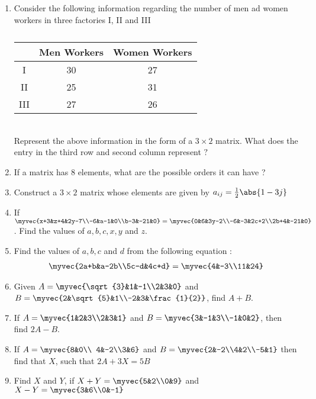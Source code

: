 \begin{enumerate}
\item Consider the following information regarding the number of men ad women workers in three factories I, II and III 
\begin{table}[ht!]
\centering
\begin{tabular}{|c|c|c|}
\hline
 & Men Workers & Women Workers\\
\hline
I &30&27\\
\hline
II  &25&31\\
\hline
III &27&26\\
\hline
\end{tabular}
\caption{}
\end{table}\\
Represent the above information in the form of a $3\times 2$ matrix. What does the entry in the third row and second column represent $?$
\item If a matrix has $8$ elements, what are the possible orders it can have ?
\item Construct a $3\times 2$ matrix whose elements are given by $a_{ij}= \frac{1}{2}\abs{1-3j}$
\item If $\myvec{x+3&z+4&2y-7\\-6&a-1&0\\b-3&-21&0}=\myvec{0&6&3y-2\\-6&-3&2c+2\\2b+4&-21&0}$. Find the values of $a,b,c,x,y$ and $z$. 
\item Find the values of $a, b, c$ and $d$ from the following equation :
\begin{align} 
\myvec{2a+b&a-2b\\5c-d&4c+d} = \myvec{4&-3\\11&24} 
\end{align}
\item Given $A=\myvec{\sqrt{3}&1&-1\\2&3&0}$ and $B=\myvec{2&\sqrt{5}&1\\-2&3&\frac{1}{2}}$, find $A+B$.
\item If $A=\myvec{1&2&3\\2&3&1}$ and $B=\myvec{3&-1&3\\-1&0&2}$, then find $2A-B$.
\item If $A=\myvec{8&0\\ 4&-2\\3&6}$ and $B=\myvec{2&-2\\4&2\\-5&1}$ then find that $X$, such that $2A+3X=5B$
\item Find $X$ and $Y$, if $X+Y=\myvec{5&2\\0&9}$ and $X-Y=\myvec{3&6\\0&-1}$

\end{enumerate}
